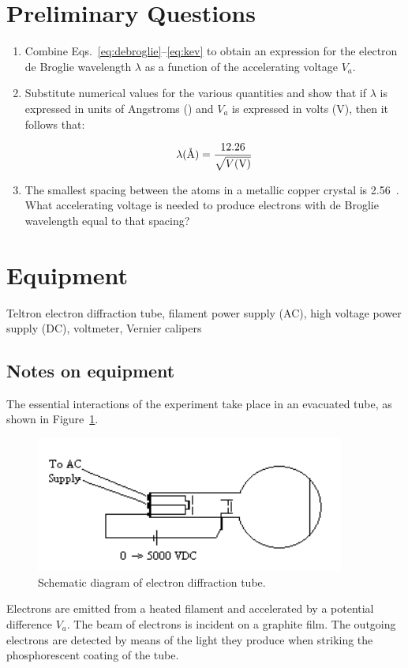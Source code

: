\documentclass{tufte-handout}
\begin{document}
\section{Preliminary Questions}
\begin{enumerate}
\item Combine Eqs.~\ref{eq:debroglie}--\ref{eq:kev} to obtain an expression for
  the electron de Broglie wavelength ${\lambda}$ as a function of the
  accelerating voltage $V_a$.

\item Substitute numerical values for the various quantities and show that if
  $\lambda$ is expressed in units of Angstroms (\angstrom) and $V_a$ is
  expressed in volts (V), then it follows that:

\begin{equation}
\lambda(\text{\normalfont\AA}) = {12.26 \over \sqrt{V({\rm V})} }
\end{equation}

\item The smallest spacing between the atoms in a metallic copper crystal is
  2.56~\angstrom. What accelerating voltage is needed to produce electrons with
  de Broglie wavelength equal to that spacing?
\end{enumerate}

\section{Equipment}
Teltron electron diffraction tube, filament power supply (AC), high voltage power supply (DC), voltmeter, Vernier calipers

\subsection{Notes on equipment}

The essential interactions of the experiment take place in an evacuated
tube, as shown in Figure~\ref{fig:schematic}. 
\begin{figure}
\begin{centering}
  \includegraphics[width=4in]{../images/ediffraction-img1.png}
\caption{Schematic diagram of electron diffraction tube.}
\label{fig:schematic}
\end{centering}
\end{figure}
Electrons are emitted from a heated filament and accelerated by a potential
difference $V_a$.  The beam of electrons is incident on a graphite film.  The
outgoing electrons are detected by means of the light they produce when striking
the phosphorescent coating of the tube.
\end{document}
